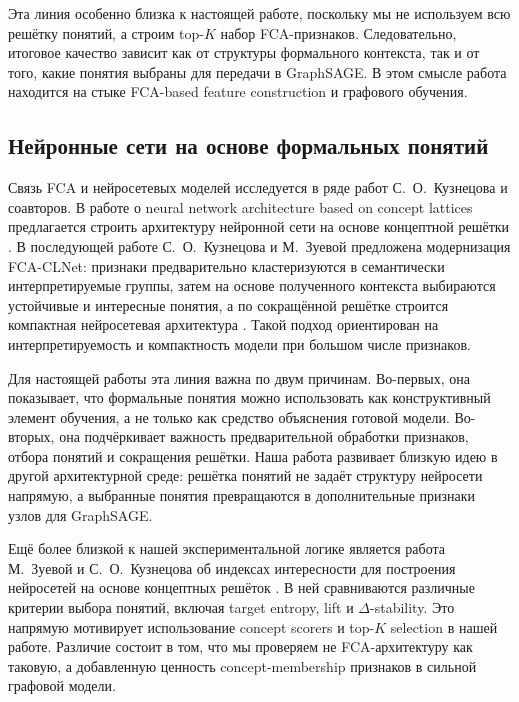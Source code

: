 \documentclass[14pt,a4paper]{extarticle}
\begin{document}
Эта линия особенно близка к настоящей работе, поскольку мы не используем всю
решётку понятий, а строим top-$K$ набор FCA-признаков. Следовательно, итоговое
качество зависит как от структуры формального контекста, так и от того, какие
понятия выбраны для передачи в GraphSAGE. В этом смысле работа находится на
стыке FCA-based feature construction и графового обучения.

\subsection{Нейронные сети на основе формальных понятий}

Связь FCA и нейросетевых моделей исследуется в ряде работ С.~О.~Кузнецова и
соавторов. В работе о neural network architecture based on concept lattices
предлагается строить архитектуру нейронной сети на основе концептной решётки
\cite{kuznetsov2017concept_lattice_nn}. В последующей работе С.~О.~Кузнецова и
М.~Зуевой предложена модернизация FCA-CLNet: признаки предварительно
кластеризуются в семантически интерпретируемые группы, затем на основе
полученного контекста выбираются устойчивые и интересные понятия, а по сокращённой
решётке строится компактная нейросетевая архитектура
\cite{kuznetsov_zueva_training_nn_concepts}. Такой подход ориентирован на
интерпретируемость и компактность модели при большом числе признаков.

Для настоящей работы эта линия важна по двум причинам. Во-первых, она показывает,
что формальные понятия можно использовать как конструктивный элемент обучения, а
не только как средство объяснения готовой модели. Во-вторых, она подчёркивает
важность предварительной обработки признаков, отбора понятий и сокращения решётки.
Наша работа развивает близкую идею в другой архитектурной среде: решётка понятий
не задаёт структуру нейросети напрямую, а выбранные понятия превращаются в
дополнительные признаки узлов для GraphSAGE.

Ещё более близкой к нашей экспериментальной логике является работа М.~Зуевой и
С.~О.~Кузнецова об индексах интересности для построения нейросетей на основе
концептных решёток \cite{zueva_kuznetsov_interestingness_nn}. В ней сравниваются
различные критерии выбора понятий, включая target entropy, lift и
$\Delta$-stability. Это напрямую мотивирует использование concept scorers и
top-$K$ selection в нашей работе. Различие состоит в том, что мы проверяем не
FCA-архитектуру как таковую, а добавленную ценность concept-membership признаков
в сильной графовой модели.
\end{document}
